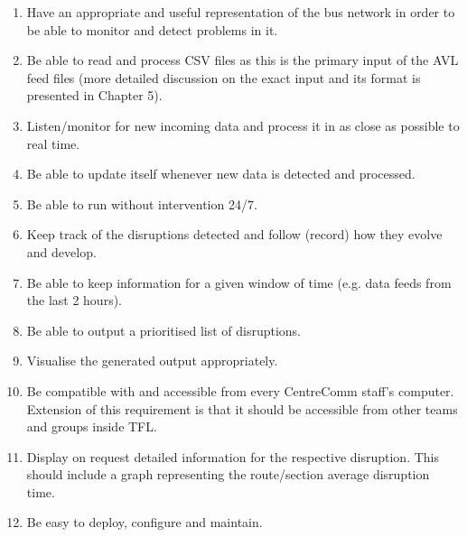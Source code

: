 \begin{enumerate}
	\item Have an appropriate and useful representation of the bus network in order to be able to monitor and detect problems in it.
	\item Be able to read and process CSV files as this is the primary input of the AVL feed files (more detailed discussion on the exact input and its format is presented in Chapter 5).
	\item Listen/monitor for new incoming data and process it in as close as possible to real time.
	\item Be able to update itself whenever new data is detected and processed.
	\item Be able to run without intervention 24/7.
	\item Keep track of the disruptions detected and follow (record) how they evolve and develop.
	\item Be able to keep information for a given window of time (e.g. data feeds from the last 2 hours).
	\item Be able to output a prioritised list of disruptions.
	\item Visualise the generated output appropriately.
	\item Be compatible with and accessible from every CentreComm staff's computer. Extension of this requirement is that it should be accessible from other teams and groups inside TFL.
	\item Display on request detailed information for the respective disruption. This should include a graph representing the route/section average disruption time.
	\item Be easy to deploy, configure and maintain.
\end{enumerate}